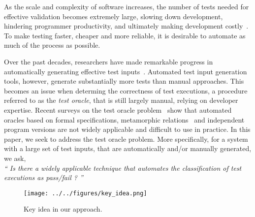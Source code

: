 
As the scale and complexity of software increases, the number of tests needed for effective validation becomes extremely large, 
slowing down development, hindering programmer productivity, and ultimately making development costly~\cite{ammann2016introduction}.
To make testing faster, cheaper and more reliable, it is desirable to automate as much of the process as possible. 

Over the past decades, researchers have
made remarkable progress in automatically generating effective test inputs~\cite{chen2013orchestrated, bertolino2007software}. Automated test input generation tools, however, generate substantially more tests than manual approaches. This becomes an issue when determing the correctness of test executions, a procedure referred to as the \emph{test oracle}, that is still largely manual, relying on developer expertise.  Recent surveys on the test oracle problem~\cite{barr2015oracle, nardi2015survey, langdon2017inferring} show that automated oracles based on formal specifications, metamorphic relations~\cite{liu6613484} and independent program versions are not 
widely applicable and difficult to use in practice. 
In this paper, we seek to address the test oracle problem. More specifically, for a system with a large set of test inputs, that are automatically 
and/or manually generated, we ask,  \\ 
\emph{`` Is there a widely applicable technique that automates the classification of test executions as pass/fail ? ''}
\begin{figure*}[h]
	\centering
	\texttt{[image: ../../figures/key\_idea.png]}
	\vspace{-6pt}
	\caption{Key idea in our approach.}
	\label{fig:key-idea}
	\vspace{-8pt}
\end{figure*}

